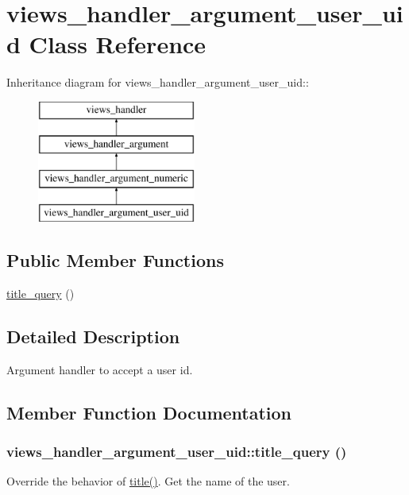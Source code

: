 \hypertarget{classviews__handler__argument__user__uid}{
\section{views\_\-handler\_\-argument\_\-user\_\-uid Class Reference}
\label{classviews__handler__argument__user__uid}
}
Inheritance diagram for views\_\-handler\_\-argument\_\-user\_\-uid::\begin{figure}[H]
\begin{center}
\leavevmode
\includegraphics[height=4cm]{classviews__handler__argument__user__uid}
\end{center}
\end{figure}
\subsection*{Public Member Functions}
\begin{DoxyCompactItemize}
\item 
\hyperlink{classviews__handler__argument__user__uid_a9ab9aa6bd71e9a2fa2a2c82a88f9dbff}{title\_\-query} ()
\end{DoxyCompactItemize}


\subsection{Detailed Description}
Argument handler to accept a user id. 

\subsection{Member Function Documentation}
\hypertarget{classviews__handler__argument__user__uid_a9ab9aa6bd71e9a2fa2a2c82a88f9dbff}{
\subsubsection[{title\_\-query}]{\setlength{\rightskip}{0pt plus 5cm}views\_\-handler\_\-argument\_\-user\_\-uid::title\_\-query ()}}
\label{classviews__handler__argument__user__uid_a9ab9aa6bd71e9a2fa2a2c82a88f9dbff}
Override the behavior of \hyperlink{classviews__handler__argument__numeric_a480758dbcde899b5483b091e51e2bf39}{title()}. Get the name of the user.


